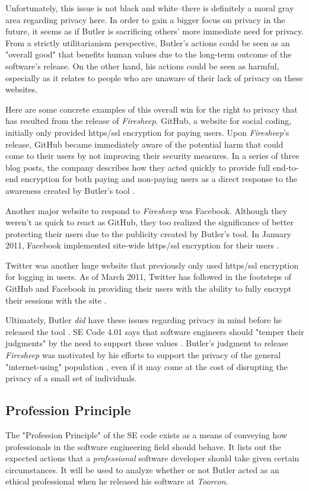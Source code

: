 \documentclass[11pt]{article}
\begin{document}
\begin{multicols}{2}
Unfortunately, this issue is not black and white--there is definitely a moral gray area regarding privacy here. In order to gain a bigger focus on privacy in the future, it seems as if Butler is sacrificing others' more immediate need for privacy. From a strictly utilitarianism perspective, Butler's actions could be seen as an "overall good" that benefits human values due to the long-term outcome of the software's release. On the other hand, his actions could be seen as harmful, especially as it relates to people who are unaware of their lack of privacy on these websites.

Here are some concrete examples of this overall win for the right to privacy that has resulted from the release of \emph{Firesheep}. GitHub, a website for social coding, initially only provided https/ssl encryption for paying users. Upon \emph{Firesheep}'s release, GitHub became immediately aware of the potential harm that could come to their users by not improving their security measures. In a series of three blog posts, the company describes how they acted quickly to provide full end-to-end encryption for both paying and non-paying users as a direct response to the awareness created by Butler's tool \cite{github_reaction}.

Another major website to respond to \emph{Firesheep} was Facebook. Although they weren't as quick to react as GitHub, they too realized the significance of better protecting their users due to the publicity created by Butler's tool. In January 2011, Facebook implemented site-wide https/ssl encryption for their users \cite{facebook_reaction}.

Twitter was another huge website that previously only used https/ssl encryption for logging in users. As of March 2011, Twitter has followed in the footsteps of GitHub and Facebook in providing their users with the ability to fully encrypt their sessions with the site \cite{twitter_reaction}.

Ultimately, Butler \emph{did} have these issues regarding privacy in mind before he released the tool \cite{codebutler_main}. SE Code 4.01 says that software engineers should "temper their judgments" by the need to support these values \cite{se_code}. Butler's judgment to release \emph{Firesheep} was motivated by his efforts to support the privacy of the general "internet-using" population \cite{codebutler_main}, even if it may come at the cost of disrupting the privacy of a small set of individuals.

\subsection{Profession Principle}
The "Profession Principle" of the SE code exists as a means of conveying how professionals in the software engineering field should behave. It lists out the expected actions that a \emph{professional} software developer should take given certain circumstances. It will be used to analyze whether or not Butler acted as an ethical professional when he released his software at \emph{Toorcon}.


\end{multicols}
\end{document}
